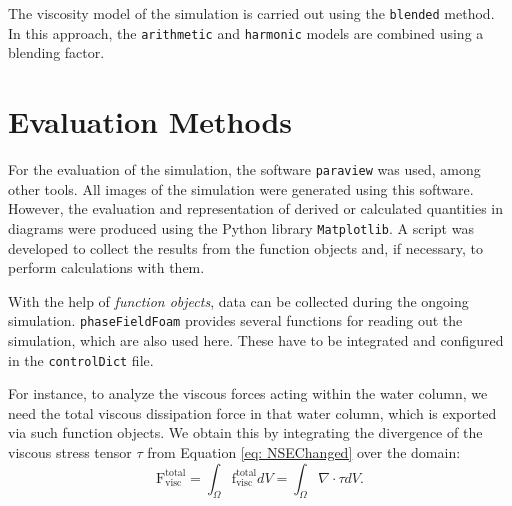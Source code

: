 The viscosity model of the simulation is carried out using the \verb|blended| method. In this approach, the \verb|arithmetic| and \verb|harmonic| models are combined using a blending factor.


\section{Evaluation Methods}
For the evaluation of the simulation, the software \verb|paraview| was used, among other tools. All images of the simulation were generated using this software. However, the evaluation and representation of derived or calculated quantities in diagrams were produced using the Python library \verb|Matplotlib|. A script was developed to collect the results from the function objects and, if necessary, to perform calculations with them.

With the help of \textit{function objects}, data can be collected during the ongoing simulation. \verb|phaseFieldFoam| provides several functions for reading out the simulation, which are also used here. These have to be integrated and configured in the \verb|controlDict| file.

For instance, to analyze the viscous forces acting within the water column, we need the total viscous dissipation force in that water column, which is exported via such function objects. We obtain this by integrating the divergence of the viscous stress tensor $\tau$ from Equation \ref{eq: NSEChanged} over the domain:
\begin{equation}
    \label{eq: total_viscForce}
    \mathrm{F}_{\mathrm{visc}}^{\mathrm{total}} = \int_{\Omega} \mathrm{f}_{\mathrm{visc}}^{\mathrm{total}} dV = \int_{\Omega} \nabla \cdot \tau dV.
\end{equation}

